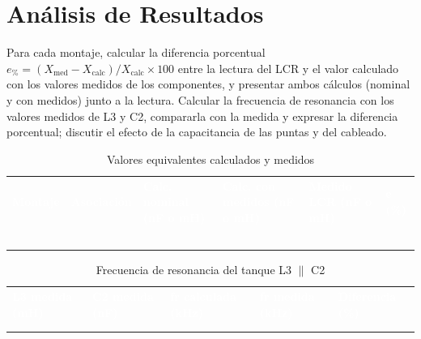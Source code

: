 \documentclass[12pt]{article}
\begin{document}
\section{Análisis de Resultados}\label{sec:analisis}
Para cada montaje, calcular la diferencia porcentual $e_{\text{\%}} = (X_{\mathrm{med}} - X_{\mathrm{calc}})/X_{\mathrm{calc}} \times 100$ entre la lectura del LCR y el valor calculado con los valores medidos de los componentes, y presentar ambos cálculos (nominal y con medidos) junto a la lectura.
\lineablanco
Calcular la frecuencia de resonancia con los valores medidos de L3 y C2, compararla con la medida y expresar la diferencia porcentual; discutir el efecto de la capacitancia de las puntas y del cableado.
\begin{table}[H]
  \centering
  \caption{Valores equivalentes calculados y medidos}
  \label{tab:registro-1}
  \begin{tabularx}{\linewidth}{>{\raggedright\arraybackslash}X>{\raggedright\arraybackslash}X>{\raggedright\arraybackslash}X>{\raggedright\arraybackslash}X>{\raggedright\arraybackslash}X>{\raggedright\arraybackslash}X}
    \rowcolor{iubnavy} \textcolor{white}{\textbf{Montaje}} & \textcolor{white}{\textbf{Asociación}} & \textcolor{white}{\textbf{Calc. nominal (nF o mH)}} & \textcolor{white}{\textbf{Calc. con medidos (nF o mH)}} & \textcolor{white}{\textbf{Medido LCR (nF o mH)}} & \textcolor{white}{\textbf{e (\%)}} \\
    \rule{0pt}{0.8cm} & & & & & \\
    \rowcolor{iubfondogris} \rule{0pt}{0.8cm} & & & & & \\
    \rule{0pt}{0.8cm} & & & & & \\
    \rowcolor{iubfondogris} \rule{0pt}{0.8cm} & & & & & \\
    \rule{0pt}{0.8cm} & & & & & \\
    \bottomrule
  \end{tabularx}
\end{table}
\begin{table}[H]
  \centering
  \caption{Frecuencia de resonancia del tanque L3 \ensuremath{\parallel} C2}
  \label{tab:registro-2}
  \begin{tabularx}{\linewidth}{>{\raggedright\arraybackslash}X>{\raggedright\arraybackslash}X>{\raggedright\arraybackslash}X>{\raggedright\arraybackslash}X>{\raggedright\arraybackslash}X}
    \rowcolor{iubnavy} \textcolor{white}{\textbf{L3 medida (mH)}} & \textcolor{white}{\textbf{C2 medida (nF)}} & \textcolor{white}{\textbf{fr calculada (kHz)}} & \textcolor{white}{\textbf{fr medida (kHz)}} & \textcolor{white}{\textbf{Diferencia (\%)}} \\
    \rule{0pt}{0.8cm} & & & & \\
    \rowcolor{iubfondogris} \rule{0pt}{0.8cm} & & & & \\
    \bottomrule
  \end{tabularx}
\end{table}
\end{document}
